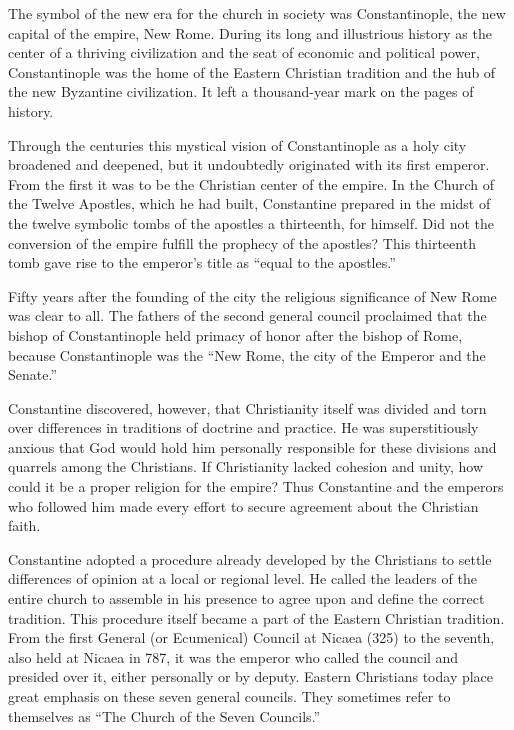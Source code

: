 The symbol of the new era for the church in society was Constantinople, the new capital of the
empire, New Rome. During its long and illustrious history as the center of a thriving civilization
and the seat of economic and political power, Constantinople was the home of the Eastern Christian
tradition and the hub of the new Byzantine civilization. It left a thousand-year mark on the pages
of history.

Through the centuries this mystical vision of Constantinople as a holy city broadened and deepened,
but it undoubtedly originated with its first emperor. From the first it was to be the Christian
center of the empire. In the Church of the Twelve Apostles, which he had built, Constantine prepared
in the midst of the twelve symbolic tombs of the apostles a thirteenth, for himself. Did not the
conversion of the empire fulfill the prophecy of the apostles? This thirteenth tomb gave rise to the
emperor’s title as “equal to the apostles.”

Fifty years after the founding of the city the religious significance of New Rome was clear to all.
The fathers of the second general council proclaimed that the bishop of Constantinople held primacy
of honor after the bishop of Rome, because Constantinople was the “New Rome, the city of the Emperor
and the Senate.”

Constantine discovered, however, that Christianity itself was divided and torn over differences in
traditions of doctrine and practice. He was superstitiously anxious that God would hold him
personally responsible for these divisions and quarrels among the Christians. If Christianity lacked
cohesion and unity, how could it be a proper religion for the empire? Thus Constantine and the
emperors who followed him made every effort to secure agreement about the Christian faith.

Constantine adopted a procedure already developed by the Christians to settle differences of opinion
at a local or regional level. He called the leaders of the entire church to assemble in his presence
to agree upon and define the correct tradition. This procedure itself became a part of the Eastern
Christian tradition. From the first General (or Ecumenical) Council at Nicaea (325) to the seventh,
also held at Nicaea in 787, it was the emperor who called the council and presided over it, either
personally or by deputy. Eastern Christians today place great emphasis on these seven general
councils. They sometimes refer to themselves as “The Church of the Seven Councils.”

